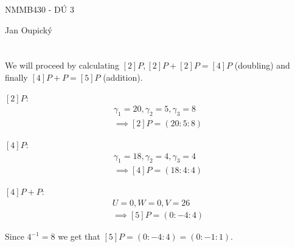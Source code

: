 \documentclass[12pt, a4paper]{article}
\begin{document}
\begin{center}
\large NMMB430 - DÚ 3

\normalsize Jan Oupický
\end{center}
\vspace{1\baselineskip}

\section{}
We will proceed by calculating $[2]P, [2]P+[2]P = [4]P$ (doubling) and finally $[4]P+P=[5]P$ (addition).

$[2]P$:
\begin{gather*}
\gamma_1 = 20, \gamma_2 = 5, \gamma_3 = 8\\
\implies
[2]P = (20:5:8)
\end{gather*}

$[4]P$:
\begin{gather*}
\gamma_1 = 18, \gamma_2 = 4, \gamma_3 = 4\\
\implies
[4]P = (18:4:4)
\end{gather*}

$[4]P+P$:
\begin{gather*}
U = 0, W = 0, V = 26\\
\implies
[5]P = (0:-4:4)
\end{gather*}

Since $4^{-1} = 8$ we get that $[5]P = (0:-4:4) = (0:-1:1)$.
\end{document}
